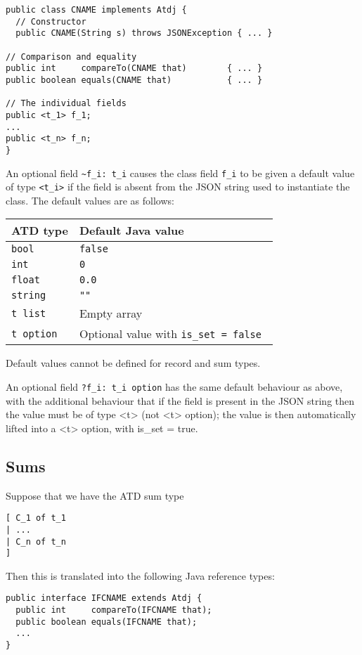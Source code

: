 \begin{verbatim}
public class CNAME implements Atdj {
  // Constructor
  public CNAME(String s) throws JSONException { ... }

// Comparison and equality
public int     compareTo(CNAME that)        { ... }
public boolean equals(CNAME that)           { ... }

// The individual fields
public <t_1> f_1;
...
public <t_n> f_n;
}
\end{verbatim}

An optional field \texttt{\~{}f\_i: t\_i} causes the class field
\texttt{f\_i} to be given a default
value of type \texttt{<t\_i>} if the field is absent from the JSON
string used to instantiate the class.  The default values are as follows:

\begin{tabular}{ll}
\toprule
ATD type & Default Java value \\
\midrule
\tt bool     & \tt false \\
\tt int      & \tt 0 \\
\tt float    & \tt 0.0 \\
\tt string   & \tt "" \\
\tt t list   & Empty array \\
\tt t option & Optional value with \tt is\_set = false \\
\bottomrule
\end{tabular}

Default values cannot be defined for record and sum types.

An optional field \texttt{?f\_i: t\_i option} has the same default
behaviour as above,
with the additional behaviour that if the field is present in the JSON string
then the value must be of type <t> (not <t> option); the value is then
automatically lifted into a <t> option, with is\_set = true.

\subsection{Sums}

Suppose that we have the ATD sum type

\begin{verbatim}
[ C_1 of t_1
| ...
| C_n of t_n
]
\end{verbatim}

Then this is translated into the following Java reference types:

\begin{verbatim}
public interface IFCNAME extends Atdj {
  public int     compareTo(IFCNAME that);
  public boolean equals(IFCNAME that);
  ...
}
\end{verbatim}

